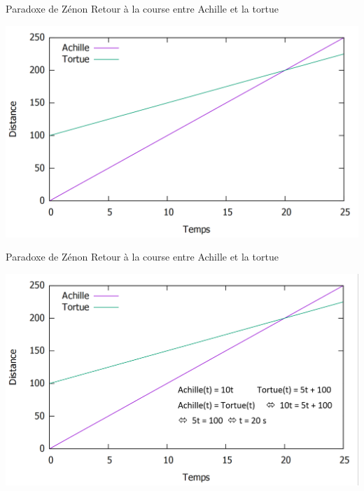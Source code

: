 \documentclass[usenames, dvipsnames]{beamer}
\begin{document}
\begin{frame}[plain]{Paradoxe de Zénon}
Retour à la course entre Achille et la tortue 
\pause
\begin{center}
\includegraphics[scale=0.35]{images/ZAPT2.png}
\end{center}
\end{frame}



\begin{frame}[plain]{Paradoxe de Zénon}
Retour à la course entre Achille et la tortue
\begin{center}
\includegraphics[scale=0.35]{images/ZAPT3.png}
\end{center}
\end{frame}
\end{document}
